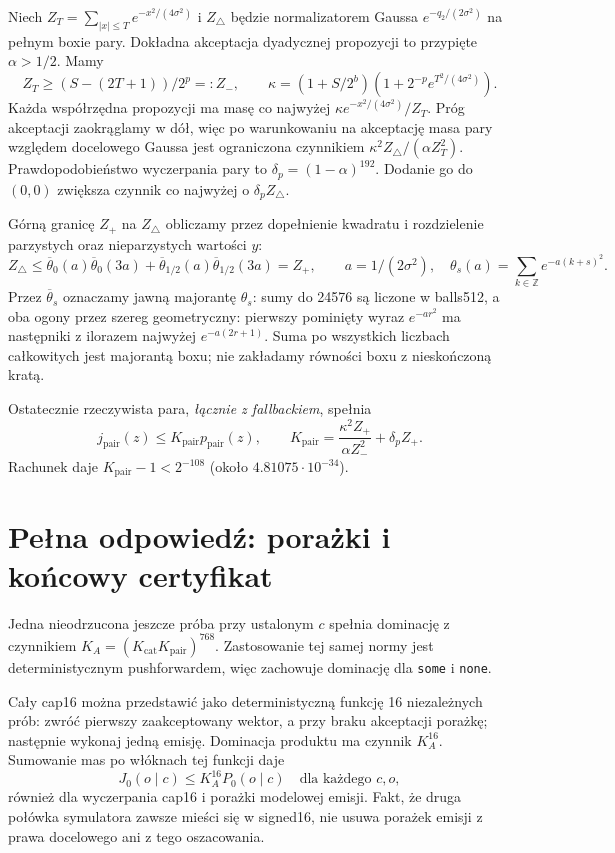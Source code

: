 \documentclass[11pt,a4paper]{article}
\newcommand{\code}[1]{\nolinkurl{#1}}
\begin{document}
Niech $Z_T=\sum_{|x|\le T}e^{-x^2/(4\sigma^2)}$ i $Z_\triangle$ będzie
normalizatorem Gaussa $e^{-q_2/(2\sigma^2)}$ na pełnym boxie pary.
Dokładna akceptacja dyadycznej propozycji to przypięte $\alpha>1/2$.
Mamy
\[
 Z_T\ge(S-(2T+1))/2^p=:Z_-,\qquad
 \kappa=(1+S/2^b)(1+2^{-p}e^{T^2/(4\sigma^2)}).
\]
Każda współrzędna propozycji ma masę co najwyżej
$\kappa e^{-x^2/(4\sigma^2)}/Z_T$.
Próg akceptacji zaokrąglamy w dół, więc po warunkowaniu na akceptację
masa pary względem docelowego Gaussa jest ograniczona czynnikiem
$\kappa^2 Z_\triangle/(\alpha Z_T^2)$.
Prawdopodobieństwo wyczerpania pary to $\delta_p=(1-\alpha)^{192}$.
Dodanie go do $(0,0)$ zwiększa czynnik co najwyżej o $\delta_pZ_\triangle$.

Górną granicę $Z_+$ na $Z_\triangle$ obliczamy przez dopełnienie kwadratu
i rozdzielenie parzystych oraz nieparzystych wartości $y$:
\[
Z_\triangle\le
 \overline\theta_0(a)\overline\theta_0(3a)
 +\overline\theta_{1/2}(a)\overline\theta_{1/2}(3a)=Z_+,\qquad
 a=1/(2\sigma^2),\quad
 \theta_s(a)=\sum_{k\in\mathbb Z}e^{-a(k+s)^2}.
\]
Przez $\overline\theta_s$ oznaczamy jawną majorantę $\theta_s$:
sumy do 24576 są liczone w balls512, a oba ogony przez szereg geometryczny:
pierwszy pominięty wyraz $e^{-ar^2}$ ma następniki z ilorazem najwyżej
$e^{-a(2r+1)}$. Suma po wszystkich liczbach całkowitych jest majorantą
boxu; nie zakładamy równości boxu z nieskończoną kratą.

Ostatecznie rzeczywista para, \emph{łącznie z fallbackiem}, spełnia
\[
 j_{\mathrm{pair}}(z)\le K_{\mathrm{pair}}p_{\mathrm{pair}}(z),\qquad
 K_{\mathrm{pair}}=
 \frac{\kappa^2 Z_+}{\alpha Z_-^2}+\delta_p Z_+.
\]
Rachunek daje $K_{\mathrm{pair}}-1<2^{-108}$
(około $4.81075\cdot10^{-34}$).

\section{Pełna odpowiedź: porażki i końcowy certyfikat}
Jedna nieodrzucona jeszcze próba przy ustalonym $c$ spełnia dominację
z czynnikiem
$K_A=(K_{\mathrm{cat}}K_{\mathrm{pair}})^{768}$.
Zastosowanie tej samej normy jest deterministycznym pushforwardem,
więc zachowuje dominację dla \code{some} i \code{none}.

Cały cap16 można przedstawić jako deterministyczną funkcję 16 niezależnych
prób: zwróć pierwszy zaakceptowany wektor, a przy braku akceptacji porażkę;
następnie wykonaj jedną emisję. Dominacja produktu ma czynnik $K_A^{16}$.
Sumowanie mas po włóknach tej funkcji daje
\[
 J_0(o\mid c)\le K_A^{16}P_0(o\mid c)
 \quad\text{dla każdego }c,o,
\]
również dla wyczerpania cap16 i porażki modelowej emisji.
Fakt, że druga połówka symulatora zawsze mieści się w signed16,
nie usuwa porażek emisji z prawa docelowego ani z tego oszacowania.
\end{document}
